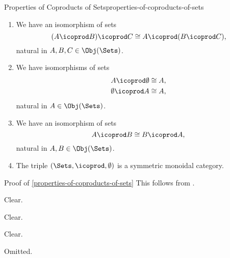 \begin{proposition}{Properties of Coproducts of Sets}{properties-of-coproducts-of-sets}
\begin{enumerate}
\begin{itemize}
\[                    \]%
                    for each $x\in A\icoprod B$.
            \end{itemize}
            and where $A\icoprod-$ and $-\icoprod B$ are the partial functors of $-_{1}\icoprod-_{2}$ at $A,B\in\Obj(\Sets)$.
        \item\label{properties-of-coproducts-of-sets-associativity}We have an isomorphism of sets%
            \[
                (A\icoprod B)\icoprod C
                \cong
                A\icoprod(B\icoprod C),
            \]%
            natural in $A,B,C\in\Obj(\Sets)$.
        \item\label{properties-of-coproducts-of-sets-unitality}We have isomorphisms of sets
            \begin{align*}
                A\icoprod\emptyset  &\cong A,\\
                \emptyset\icoprod A &\cong A,
            \end{align*}
            natural in $A\in\Obj(\Sets)$.
        \item\label{properties-of-coproducts-of-sets-commutativity}We have an isomorphism of sets
            \[
                A\icoprod B
                \cong
                B\icoprod A,
            \]%
            natural in $A,B\in\Obj(\Sets)$.
        \item\label{properties-of-coproducts-of-sets-symmetric-monoidality}The triple $(\Sets,\icoprod,\emptyset)$ is a symmetric monoidal category.
    \end{enumerate}
\end{proposition}
\begin{Proof}{Proof of \cref{properties-of-coproducts-of-sets}}%
    This follows from .

    Clear.

    Clear.

    Clear.

    Omitted.
\end{Proof}
